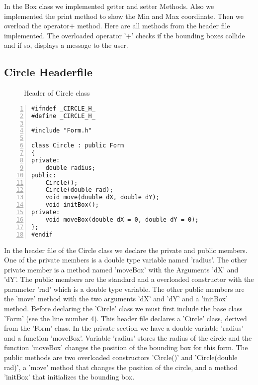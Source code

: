 \documentclass{article}
\begin{document}
\normalsize{In the Box class we implemented getter and setter Methods. Also we implemented the print method to show the Min and Max coordinate. Then we overload the  operator$+$ method.\newline
\newline
Here are all methods from the header file implemented.
The overloaded operator '+' checks if the bounding boxes collide and if so, displays a message to the user.
}\newpage
\subsection{Circle Headerfile}
\begin{figure}
\scriptsize{\caption{Header of Circle class}}
\end{figure}
\begin{lstlisting}[basicstyle=\footnotesize\ttfamily, numbers=left, stepnumber=1, numberstyle = \normalsize]
#ifndef _CIRCLE_H_
#define _CIRCLE_H_

#include "Form.h"

class Circle : public Form
{
private:
	double radius;
public:
	Circle();
	Circle(double rad);
	void move(double dX, double dY);
	void initBox();
private:
	void moveBox(double dX = 0, double dY = 0);
};
#endif
\end{lstlisting}
\normalsize{In the header file of the Circle class we declare the private and public members. One of the private members is a double type variable named 'radius'. The other private member is a method named 'moveBox' with the Arguments 'dX' and 'dY'. The public members are the standard and a overloaded constructor with the parameter 'rad' which is a double type variable. The other public members are the 'move' method with the two arguments 'dX' and 'dY' and a 'initBox' method.\newline
\newline
Before declaring the 'Circle' class we must first include the base class 'Form' (see the line number 4).
This header file declares a 'Circle' class, derived from the 'Form' class.
In the private section we have a double variable 'radius' and a function 'moveBox'. Variable 'radius' stores the radius of the circle and the function 'moveBox' changes the position of the bounding box for this form.
The public methods are two overloaded constructors 'Circle()' and 'Circle(double rad)', a 'move' method that changes the position of the circle, and a method 'initBox' that initializes the bounding box.

}
\newpage
\end{document}
